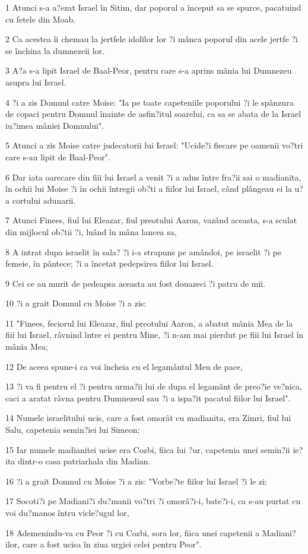 \par 1 Atunci s-a a?ezat Israel în Sitim, dar poporul a început sa se spurce, pacatuind cu fetele din Moab.
\par 2 Ca acestea îi chemau la jertfele idolilor lor ?i mânca poporul din acele jertfe ?i se închina la dumnezeii lor.
\par 3 A?a s-a lipit Israel de Baal-Peor, pentru care s-a aprins mânia lui Dumnezeu asupra lui Israel.
\par 4 ?i a zis Domnul catre Moise: "Ia pe toate capeteniile poporului ?i le spânzura de copaci pentru Domnul înainte de asfin?itul soarelui, ca sa se abata de la Israel iu?imea mâniei Domnului".
\par 5 Atunci a zis Moise catre judecatorii lui Israel: "Ucide?i fiecare pe oamenii vo?tri care s-au lipit de Baal-Peor".
\par 6 Dar iata oarecare din fiii lui Israel a venit ?i a adus între fra?ii sai o madianita, în ochii lui Moise ?i în ochii întregii ob?ti a fiilor lui Israel, când plângeau ei la u?a cortului adunarii.
\par 7 Atunci Finees, fiul lui Eleazar, fiul preotului Aaron, vazând aceasta, s-a sculat din mijlocul ob?tii ?i, luând în mâna lancea sa,
\par 8 A intrat dupa israelit în sala? ?i i-a strapuns pe amândoi, pe israelit ?i pe femeie, în pântece; ?i a încetat pedepsirea fiilor lui Israel.
\par 9 Cei ce au murit de pedeapsa aceasta au fost douazeci ?i patru de mii.
\par 10 ?i a grait Domnul cu Moise ?i a zis:
\par 11 "Finees, feciorul lui Eleazar, fiul preotului Aaron, a abatut mânia Mea de la fiii lui Israel, râvnind între ei pentru Mine, ?i n-am mai pierdut pe fiii lui Israel în mânia Mea;
\par 12 De aceea spune-i ca voi încheia cu el legamântul Meu de pace,
\par 13 ?i va fi pentru el ?i pentru urma?ii lui de dupa el legamânt de preo?ie ve?nica, caci a aratat râvna pentru Dumnezeul sau ?i a ispa?it pacatul fiilor lui Israel".
\par 14 Numele israelitului ucis, care a fost omorât cu madianita, era Zimri, fiul lui Salu, capetenia semin?iei lui Simeon;
\par 15 Iar numele madianitei ucise era Cozbi, fiica lui ?ur, capetenia unei semin?ii ie?ita dintr-o casa patriarhala din Madian.
\par 16 ?i a grait Domnul cu Moise ?i a zis: "Vorbe?te fiilor lui Israel ?i le zi:
\par 17 Socoti?i pe Madiani?i du?manii vo?tri ?i omorâ?i-i, bate?i-i, ca s-au purtat cu voi du?manos întru vicle?ugul lor,
\par 18 Ademenindu-va cu Peor ?i cu Cozbi, sora lor, fiica unei capetenii a Madiani?ilor, care a fost ucisa în ziua urgiei celei pentru Peor".

